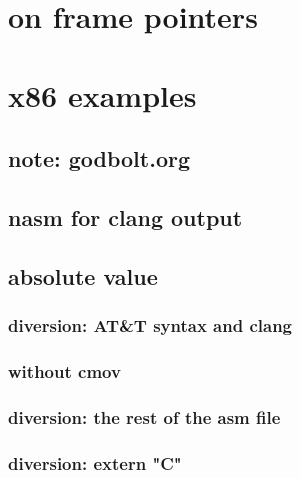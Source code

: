 

\section{on frame pointers}




\section{x86 examples}

\subsection{note: godbolt.org}



\subsection{nasm for clang output}



\subsection{absolute value}





\subsubsection{diversion: AT\&T syntax and clang}





\subsubsection{without cmov}



\subsubsection{diversion: the rest of the asm file}


\subsubsection{diversion: extern "C"}

